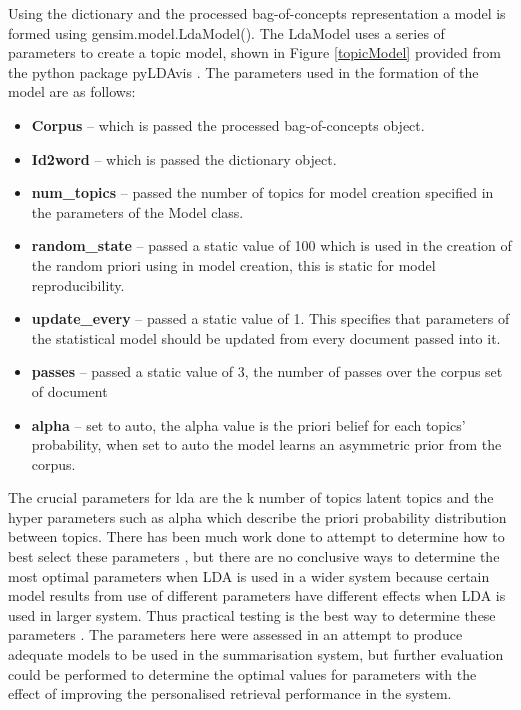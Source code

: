 Using the dictionary and the processed bag-of-concepts representation a model is formed using gensim.model.LdaModel(). The LdaModel uses a series of parameters to create a topic model, shown in Figure \ref{topicModel} provided from the python package pyLDAvis \citep{sievert2014ldavis}. The parameters used in the formation of the model are as follows:
\begin{itemize}
    \item \textbf{Corpus} – which is passed the processed bag-of-concepts object.
    \item \textbf{Id2word} – which is passed the dictionary object.
    \item \textbf{num\_topics} – passed the number of topics for model creation specified in the parameters of the Model class.
    \item \textbf{random\_state} – passed a static value of 100 which is used in the creation of the random priori using in model creation, this is static for model reproducibility.
    \item \textbf{update\_every} – passed a static value of 1. This specifies that parameters of the statistical model should be updated from every document passed into it.
    \item \textbf{passes} – passed a static value of 3, the number of passes over the corpus set of document
    \item \textbf{alpha} – set to auto, the alpha value is the priori belief for each topics’ probability, when set to auto the model learns an asymmetric prior from the corpus.
\end{itemize}

The crucial parameters for lda are the k number of topics latent topics and the hyper parameters such as alpha which describe the priori probability distribution between topics. There has been much work done to attempt to determine how to best select these parameters \citep{yau2014clustering,carter2016reading}, but there are no conclusive ways to determine the most optimal parameters when LDA is used in a wider system because certain model results from use of different parameters have different effects when LDA is used in larger system. Thus practical testing is the best way to determine these parameters \citep{suominen2016map}. The parameters here were assessed in an attempt to produce adequate models to be used in the summarisation system, but further evaluation could be performed to determine the optimal values for parameters with the effect of improving the personalised retrieval performance in the system.

